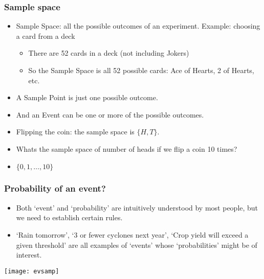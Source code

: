 \begin{frame}
\frametitle{Sample space }
\begin{itemize}
\item  
Sample Space: all the possible outcomes of an experiment. Example: choosing a card from a deck 
\begin{itemize}
\item There are 52 cards in a deck (not including Jokers) 
\item So  the  Sample  Space  is  all  52  possible  cards:  {Ace  of  Hearts,  2  of 
Hearts, etc. } 
\end{itemize}
\item A Sample Point is just one possible outcome. 
\item And an Event can be one or more of the possible outcomes. 
\item Flipping the coin:  the sample space is  $\{H,T\}$.

\item Whats the sample space of number of heads if we flip a coin 10 times?

\item $\{0,1,\ldots,10\}$

\end{itemize}
\end{frame}

\begin{frame}
\frametitle{Probability of an event? }
\begin{itemize}
\item  Both `event' and `probability' are intuitively understood by most 
people, but we need to establish certain rules. 
\item  `Rain tomorrow', `3 or fewer cyclones next year', `Crop yield will 
exceed a given threshold' are  all examples of `events' whose 
`probabilities' might be of interest. 
\end{itemize}

\begin{center}
\texttt{[image: evsamp]}
\end{center}
\end{frame}


%

